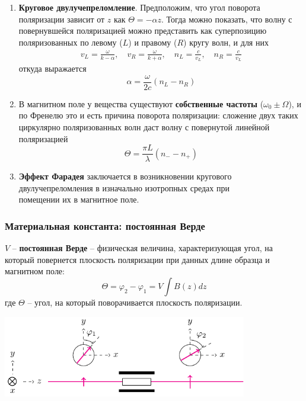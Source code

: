 \documentclass[10pt,pdf,hyperref={unicode}, dvipsnames]{beamer}
\begin{document}

\begin{frame}[t]
	\begin{enumerate}
		\item \textbf{Круговое двулучепреломление}. Предположим, что угол поворота поляризации зависит от $z$ как
		      $\Theta=-\alpha z$. Тогда можно показать, что волну с повернувшейся поляризацией можно представить как суперпозицию поляризованных по левому ($L$) и правому ($R$) кругу волн, и для них
		      \begin{gather*}
			      v_L=\frac{\omega}{k-\alpha},
			      \quad
			      v_R=\frac{\omega}{k+\alpha},
			      \quad
			      n_L=\frac{c}{v_L},
			      \quad
			      n_R=\frac{c}{v_L}
		      \end{gather*}
		      откуда выражается
		      \begin{equation*}
			      \alpha=\frac{\omega}{2c}(n_L-n_R)
		      \end{equation*}
		\item В магнитном поле у вещества существуют \textbf{собственные частоты} ($\omega_0\pm\Omega$),
		      и по Френелю это и есть причина поворота поляризации: сложение двух таких циркулярно поляризованных волн даст волну с повернутой линейной поляризацией
		      \begin{equation*}
			      \Theta=\frac{\pi L}{\lambda}(n_--n_+)
		      \end{equation*}
		\item \textbf{Эффект Фарадея} заключается в возникновении кругового двулучепреломления в изначально изотропных средах при \\помещении их в магнитное поле.
	\end{enumerate}
\end{frame}


\begin{frame}
	\frametitle{Материальная константа: постоянная Верде}
	$V$ -- \textbf{постоянная Верде} -- физическая величина, характеризующая угол, на который повернется плоскость поляризации при данных длине образца и магнитном поле:
	\begin{equation}
		\Theta=\varphi_2-\varphi_1=V \int B(z)dz
	\end{equation}
	где $\Theta$ -- угол, на который поворачивается плоскость поляризации.
	\begin{center}
		\includegraphics[width=0.8\textwidth]{images/rotpol}
	\end{center}
\end{frame}
\end{document}
